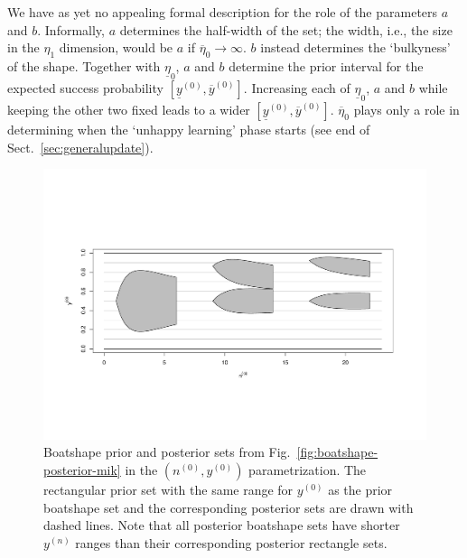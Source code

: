 \documentclass[runningheads,a4paper]{llncs}
\newcommand{\uz}{^{(0)}} %
\newcommand{\un}{^{(n)}} %
\newcommand{\ul}[1]{\underline{#1}}
\newcommand{\ol}[1]{\overline{#1}}
\def\yz{y\uz}
\def\yn{y\un}
\def\yzl{\ul{y}\uz}
\def\yzu{\ol{y}\uz}
\def\nz{n\uz}
\def\ezl{\ul{\eta}_0}
\def\ezu{\ol{\eta}_0}
\begin{document}
We have as yet no appealing formal description for the role of the parameters $a$ and $b$. %
Informally, $a$ determines the half-width of the set;
the width, i.e., the size in the $\eta_1$ dimension, would be $a$ if $\ezu \to \infty$.
$b$ instead determines the `bulkyness' of the shape.
Together with $\ezl$, $a$ and $b$ determine the prior interval for the expected success probability $[\yzl, \yzu]$.
Increasing each of $\ezl$, $a$ and $b$ while keeping the other two fixed leads to a wider $[\yzl, \yzu]$.
$\ezu$ plays only a role in determining when the `unhappy learning' phase starts
(see end of Sect.~\ref{sec:generalupdate}).
\begin{figure}  %
\centering
\includegraphics[width=\textwidth]{R/boatshape-posterior-normal}%
\caption[Boatshape prior and posterior sets from Fig.~\ref{fig:boatshape-posterior-mik} in the $(\nz,\yz)$ parametrization.]%
{Boatshape prior and posterior sets from Fig.~\ref{fig:boatshape-posterior-mik} in the $(\nz,\yz)$ parametrization.
The rectangular prior set with the same range for $\yz$ as the prior boatshape set
and the corresponding posterior sets are drawn with dashed lines. 
Note that all posterior boatshape sets have shorter $\yn$ ranges than their corresponding posterior rectangle sets.}
\label{fig:boatshape-posterior-normal}
\end{figure}
\end{document}
